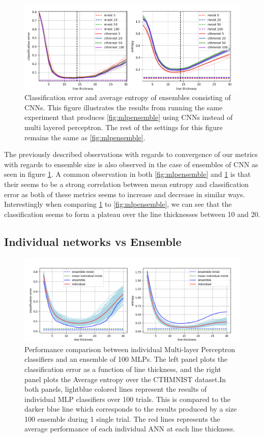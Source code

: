 \begin{figure}
    \centering
    \includegraphics[scale=0.6]{figure/cnnEnsemble.png}
    \caption{Classification error and average entropy of ensembles consisting of CNNs. This figure illustrates the results from running the same experiment that produces \ref{fig:mlpensemble} using CNNs instead of multi layered perceptron. The rest of the settings for this figure remains the same as \ref{fig:mlpensemble}.}
    \label{fig:cnnensemble}
\end{figure}

The previously described observations with regards to convergence of our metrics with regards to ensemble size is also observed in the case of ensembles of CNN as seen in figure \ref{fig:cnnensemble}. A common observation in both \ref{fig:mlpensemble} and \ref{fig:cnnensemble} is that their seems to be a strong correlation between mean entropy and classification error as both of these metrics seems to increase and decrease in similar ways. Interestingly when comparing \ref{fig:cnnensemble} to \ref{fig:mlpensemble}, we can see that the classification seems to form a plateau over the line thicknesses between 10 and 20. 

\subsection{Individual networks vs Ensemble}
\begin{figure}
    \centering
    \includegraphics[scale=0.55]{figure/EnsembleVsIndividual.png}
    \caption{Performance comparison between individual Multi-layer Perceptron classifiers and an ensemble of 100 MLPs. The left panel plots the classification error as a function of line thickness, and the right panel plots the Average entropy over the CTHMNIST dataset.In both panels, lightblue colored lines represent the results of individual MLP classifiers over 100 trials. This is compared to the darker blue line which corresponds to the results produced by a size 100 ensemble during 1 single trial. The red lines represents the average performance of each individual ANN at each line thickness.}
    \label{fig:mlpvsensemble}
\end{figure}

